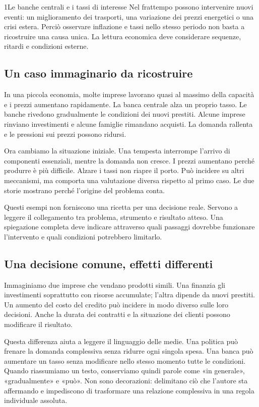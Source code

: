 \begin{lettura}{1}{Le banche centrali e i tassi di interesse}
Nel frattempo possono intervenire nuovi eventi: un miglioramento dei trasporti, una variazione dei prezzi energetici o una crisi estera. Perciò osservare inflazione e tassi nello stesso periodo non basta a ricostruire una causa unica. La lettura economica deve considerare sequenze, ritardi e condizioni esterne.

\subsection*{Un caso immaginario da ricostruire}
In una piccola economia, molte imprese lavorano quasi al massimo della capacità e i prezzi aumentano rapidamente. La banca centrale alza un proprio tasso. Le banche rivedono gradualmente le condizioni dei nuovi prestiti. Alcune imprese rinviano investimenti e alcune famiglie rimandano acquisti. La domanda rallenta e le pressioni sui prezzi possono ridursi.

Ora cambiamo la situazione iniziale. Una tempesta interrompe l'arrivo di componenti essenziali, mentre la domanda non cresce. I prezzi aumentano perché produrre è più difficile. Alzare i tassi non riapre il porto. Può incidere su altri meccanismi, ma comporta una valutazione diversa rispetto al primo caso. Le due storie mostrano perché l'origine del problema conta.

Questi esempi non forniscono una ricetta per una decisione reale. Servono a leggere il collegamento tra problema, strumento e risultato atteso. Una spiegazione completa deve indicare attraverso quali passaggi dovrebbe funzionare l'intervento e quali condizioni potrebbero limitarlo.

\subsection*{Una decisione comune, effetti differenti}
Immaginiamo due imprese che vendano prodotti simili. Una finanzia gli investimenti soprattutto con risorse accumulate; l'altra dipende da nuovi prestiti. Un aumento del costo del credito può incidere in modo diverso sulle loro decisioni. Anche la durata dei contratti e la situazione dei clienti possono modificare il risultato.

Questa differenza aiuta a leggere il linguaggio delle medie. Una politica può frenare la domanda complessiva senza ridurre ogni singola spesa. Una banca può aumentare un tasso senza modificare nello stesso momento tutte le condizioni. Quando riassumiamo un testo, conserviamo quindi parole come «in generale», «gradualmente» e «può». Non sono decorazioni: delimitano ciò che l'autore sta affermando e impediscono di trasformare una relazione complessiva in una regola individuale assoluta.


\end{lettura}
